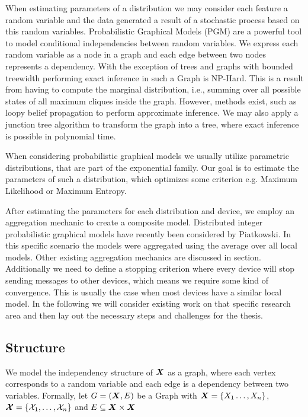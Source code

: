 When estimating parameters of a distribution we may consider each feature a random variable and the data generated a result of a stochastic process based on this random variables.
Probabilistic Graphical Models (PGM) are a powerful tool to model conditional independencies between random variables. 
We express each random variable as a node in a graph and each edge between two nodes represents a dependency. 
With the exception of trees and graphs with bounded treewidth performing exact inference in such a Graph is NP-Hard.
This is a result from having to compute the marginal distribution, i.e., summing over all possible states of all maximum cliques inside the graph.
However, methods exist, such as loopy belief propagation to perform approximate inference.
We may also apply a junction tree algorithm to transform the graph into a tree, where exact inference is possible in polynomial time.

When considering probabilistic graphical models we usually utilize parametric distributions, that are part of the exponential family. 
Our goal is to estimate the parameters of such a distribution, which optimizes some criterion e.g. Maximum Likelihood or Maximum Entropy.


After estimating the parameters for each distribution and device, we employ an aggregation mechanic to create a composite model.
Distributed integer probabilistic graphical models \cite{piatkowski2019distributed} have recently been considered by Piatkowski.
In this specific scenario the models were aggregated using the average over all local models.
Other existing aggregation mechanics are discussed in section.
Additionally we need to define a stopping criterion where every device will stop sending messages to other devices, which means we require some kind of convergence.
This is usually the case when most devices have a similar local model.
In the following we will consider existing work on that specific research area and then lay out the necessary steps and challenges for the thesis.

\subsection{Structure}
\label{ssec:struc}
We model the independency structure of $\boldsymbol{X}$ as a graph, where each vertex corresponds to a random variable and each edge is a dependency between two variables.
Formally, let $G = (\boldsymbol{X},E)$ be a Graph with $\boldsymbol{X} =\{X_1 \ldots, X_n\}$, $\boldsymbol{\mathcal{X}} = \{\mathcal{X}_1, \ldots, \mathcal{X}_n\}$ and $E \subseteq \boldsymbol{X} \times \boldsymbol{X}$
